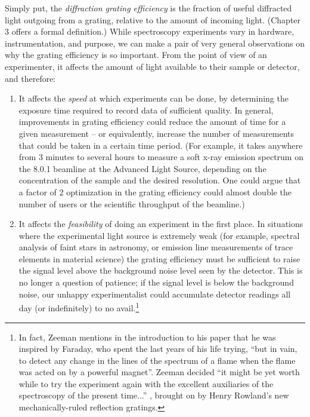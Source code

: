 Simply put, the \emph{diffraction grating efficiency} is the fraction of useful diffracted light outgoing from a grating, relative to the amount of incoming light.  (Chapter 3 offers a formal definition.)  While spectroscopy experiments vary in hardware, instrumentation, and purpose, we can make a pair of very general observations on why the grating efficiency is so important.  From the point of view of an experimenter, it affects the amount of light available to their sample or detector, and therefore:
\begin{enumerate}
\item It affects the \emph{speed} at which experiments can be done, by determining the exposure time required to record data of sufficient quality.  In general, improvements in grating efficiency could reduce the amount of time for a given measurement -- or equivalently, increase the number of measurements that could be taken in a certain time period.  (For example, it takes anywhere from 3 minutes to several hours to measure a soft x-ray emission spectrum on the 8.0.1 beamline at the Advanced Light Source, depending on the concentration of the sample and the desired resolution.  One could argue that a factor of 2 optimization in the grating efficiency could almost double the number of users or the scientific throughput of the beamline.)
\item It affects the \emph{feasibility} of doing an experiment in the first place.  In situations where the experimental light source is extremely weak (for example, spectral analysis of faint stars in astronomy, or emission line measurements of trace elements in material science) the grating efficiency must be sufficient to raise the signal level above the background noise level seen by the detector.  This is no longer a question of patience; if the signal level is below the background noise, our unhappy experimentalist could accumulate detector readings all day (or indefinitely) to no avail.\footnote{In fact, Zeeman mentions in the introduction to his paper that he was inspired by Faraday, who spent the last years of his life trying, ``but in vain, to detect any change in the lines of the spectrum of a flame when the flame was acted on by a powerful magnet''.  Zeeman decided ``it might be yet worth while to try the experiment again with the excellent auxiliaries of the spectroscopy of the present time...'' \cite{Zee97}, brought on by Henry Rowland's new mechanically-ruled reflection gratings.}
\end{enumerate}

